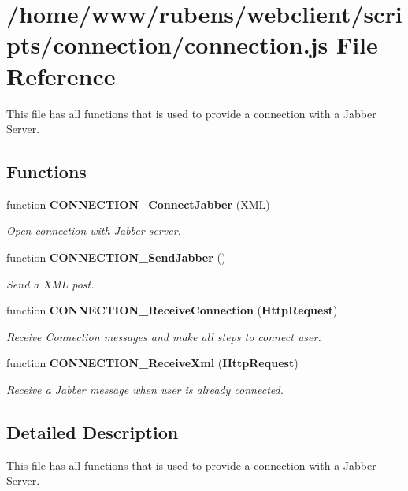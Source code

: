 \section{/home/www/rubens/webclient/scripts/connection/connection.js File Reference}
\label{connection_8js}
This file has all functions that is used to provide a connection with a Jabber Server. 

\subsection*{Functions}
\begin{CompactItemize}
\item 
function {\bf CONNECTION\_\-ConnectJabber} (XML)
\begin{CompactList}\small\item\em Open connection with Jabber server. \item\end{CompactList}\item 
function {\bf CONNECTION\_\-SendJabber} ()
\begin{CompactList}\small\item\em Send a XML post. \item\end{CompactList}\item 
function {\bf CONNECTION\_\-ReceiveConnection} ({\bf HttpRequest})
\begin{CompactList}\small\item\em Receive Connection messages and make all steps to connect user. \item\end{CompactList}\item 
function {\bf CONNECTION\_\-ReceiveXml} ({\bf HttpRequest})
\begin{CompactList}\small\item\em Receive a Jabber message when user is already connected. \item\end{CompactList}\end{CompactItemize}


\subsection{Detailed Description}
This file has all functions that is used to provide a connection with a Jabber Server. 

